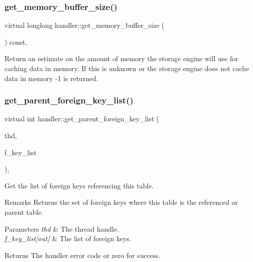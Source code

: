 \subsubsection{\texorpdfstring{get\+\_\+memory\+\_\+buffer\+\_\+size()}{get\_memory\_buffer\_size()}}
{\footnotesize\ttfamily virtual longlong handler\+::get\+\_\+memory\+\_\+buffer\+\_\+size (\begin{DoxyParamCaption}{ }\end{DoxyParamCaption}) const\hspace{0.3cm}{\ttfamily [inline]}, {\ttfamily [virtual]}}

Return an estimate on the amount of memory the storage engine will use for caching data in memory. If this is unknown or the storage engine does not cache data in memory -\/1 is returned. \mbox{\label{classhandler_a9187eea9999eba802ee4ae01f91dda3b}} 
\subsubsection{\texorpdfstring{get\+\_\+parent\+\_\+foreign\+\_\+key\+\_\+list()}{get\_parent\_foreign\_key\_list()}}
{\footnotesize\ttfamily virtual int handler\+::get\+\_\+parent\+\_\+foreign\+\_\+key\+\_\+list (\begin{DoxyParamCaption}\item[{T\+HD $\ast$}]{thd,  }\item[{\mbox{\hyperlink{classList}{List}}$<$ \mbox{\hyperlink{structst__foreign__key__info}{F\+O\+R\+E\+I\+G\+N\+\_\+\+K\+E\+Y\+\_\+\+I\+N\+FO}} $>$ $\ast$}]{f\+\_\+key\+\_\+list }\end{DoxyParamCaption})\hspace{0.3cm}{\ttfamily [inline]}, {\ttfamily [virtual]}}

Get the list of foreign keys referencing this table.

\begin{DoxyRemark}{Remarks}
Returns the set of foreign keys where this table is the referenced or parent table.
\end{DoxyRemark}

\begin{DoxyParams}{Parameters}
{\em thd} & The thread handle. \\
\hline
{\em f\+\_\+key\+\_\+list\mbox{[}out\mbox{]}} & The list of foreign keys.\\
\hline
\end{DoxyParams}
\begin{DoxyReturn}{Returns}
The handler error code or zero for success. 
\end{DoxyReturn}


